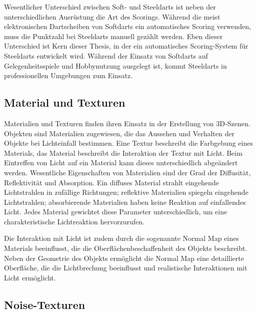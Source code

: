 Wesentlicher Unterschied zwischen Soft- und Steeldarts ist neben der unterschiedlichen Ausrüstung die Art des Scorings. Während die meist elektronischen Dartscheiben von Softdarts ein automatisches Scoring verwenden, muss die Punktzahl bei Steeldarts manuell gezählt werden. Eben dieser Unterschied ist Kern dieser Thesis, in der ein automatisches Scoring-System für Steeldarts entwickelt wird. Während der Einsatz von Softdarts auf Gelegenheitsspiele und Hobbynutzung ausgelegt ist, kommt Steeldarts in professionellen Umgebungen zum Einsatz.


\subsection{Material und Texturen}  %
\label{sec:material_texturen}

Materialien und Texturen finden ihren Einsatz in der Erstellung von 3D-Szenen. Objekten sind Materialien zugewiesen, die das Aussehen und Verhalten der Objekte bei Lichteinfall bestimmen. Eine Textur beschreibt die Farbgebung eines Materials, das Material beschreibt die Interaktion der Textur mit Licht. Beim Eintreffen von Licht auf ein Material kann dieses unterschiedlich abgeändert werden. Wesentliche Eigenschaften von Materialien sind der Grad der Diffusität, Reflektivität und Absorption. Ein diffuses Material strahlt eingehende Lichtstrahlen in zufällige Richtungen; reflektive Materialien spiegeln eingehende Lichtstrahlen; absorbierende Materialien haben keine Reaktion auf einfallendes Licht. Jedes Material gewichtet diese Parameter unterschiedlich, um eine charakteristische Lichtreaktion hervorzurufen.

Die Interaktion mit Licht ist zudem durch die sogenannte Normal Map eines Materials beeinflusst, die die Oberflächenbeschaffenheit des Objekts beschreibt. Neben der Geometrie des Objekts ermöglicht die Normal Map eine detaillierte Oberfläche, die die Lichtbrechung beeinflusst und realistische Interaktionen mit Licht ermöglicht.


\subsection{Noise-Texturen}
\label{sec:noise}

